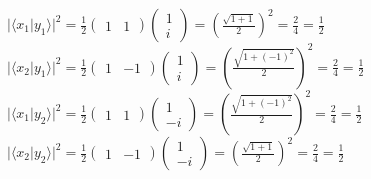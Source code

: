 \documentclass[12pt]{article}
\renewcommand{\>}{\rangle}
\newcommand{\<}{\langle}
\begin{document}
\noindent
$|\<x_1 | y_1 \>|^2 = \frac{1}{2} \left(\begin{array}{cc} 1 & 1 \end{array}\right)  \left(\begin{array}{cc} 1 \\ i\end{array}\right) = \left( \frac{\sqrt{1 + 1}}{2}\right)^2 = \frac{2}{4} = \frac{1}{2} $ \\
$|\<x_2 | y_1 \>|^2 = \frac{1}{2} \left(\begin{array}{cc} 1 & -1\end{array}\right)  \left(\begin{array}{cc} 1 \\ i\end{array}\right) = \left( \frac{\sqrt{1 + (-1)^2}}{2}\right)^2 = \frac{2}{4} = \frac{1}{2} $ \\
$|\<x_1 | y_2 \>|^2 = \frac{1}{2} \left(\begin{array}{cc} 1 & 1\end{array}\right)  \left(\begin{array}{cc} 1 \\ -i\end{array}\right) = \left( \frac{\sqrt{1 + (-1)^2}}{2}\right)^2 = \frac{2}{4} = \frac{1}{2} $ \\
$|\<x_2 | y_2 \>|^2 = \frac{1}{2} \left(\begin{array}{cc} 1 & -1\end{array}\right)  \left(\begin{array}{cc} 1 \\ -i\end{array}\right) = \left( \frac{\sqrt{1 + 1}}{2}\right)^2 = \frac{2}{4} = \frac{1}{2} $ \newline \newline
\end{document}
